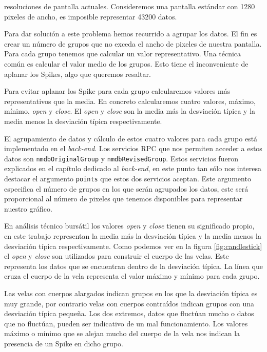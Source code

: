 		resoluciones de pantalla actuales. Consideremos una pantalla estándar con 1280 pixeles de ancho, es imposible representar 43200 datos.
		\par
		Para dar solución a este problema hemos recurrido a agrupar los datos. El fin es crear un número de grupos que no exceda el ancho de
		pixeles de nuestra pantalla. Para cada grupo tenemos que calcular un valor representativo. Una técnica común es calcular el valor
		medio de los grupos.  Esto tiene el inconveniente de aplanar los Spikes, algo que queremos resaltar.
		\par
		Para evitar aplanar los Spike para cada grupo calcularemos valores más representativos que la media. En concreto calcularemos cuatro
		valores, máximo, mínimo, \emph{open} y \emph{close}. El \emph{open} y \emph{close} son la media más la desviación típica y la media
		menos la desviación típica respectivamente.
		\par
		El agrupamiento de datos y cálculo de estos cuatro valores para cada grupo está implementado en el \emph{back-end}. Los servicios RPC
		que nos permiten acceder a estos datos son \texttt{nmdbOriginalGroup} y \texttt{nmdbRevisedGroup}. Estos servicios fueron explicados
		en el capítulo dedicado al \emph{back-end}, en este punto tan sólo nos interesa destacar el argumento \texttt{points} que estos dos
		servicios aceptan. Este argumento especifica el número de grupos en los que serán agrupados los datos, este será proporcional al
		número de pixeles que tenemos disponibles para representar nuestro gráfico. 
		\par
		En análisis técnico bursátil los valores \emph{open} y \emph{close} tienen su significado propio, en este trabajo representan la media
		más la desviación típica y la media menos la desviación típica respectivamente. Como podemos ver en la figura \ref{fig:candlestick} el
		\emph{open} y \emph{close} son utilizados para construir el cuerpo de las velas. Este representa los datos que se encuentran dentro de
		la desviación típica. La línea que cruza el cuerpo de la vela representa el valor máximo y mínimo para cada grupo.
		\par
		Las velas con cuerpos alargados indican grupos en los que la desviación típica es muy grande, por contrario velas con cuerpos
		contraídos indican grupos con una desviación típica pequeña. Los dos extremos, datos que fluctúan mucho o datos que no fluctúan,
		pueden ser indicativo de un mal funcionamiento. Los valores máximo o mínimo que se alejan mucho del cuerpo de la vela nos indican la
		presencia de un Spike en dicho grupo. 	
